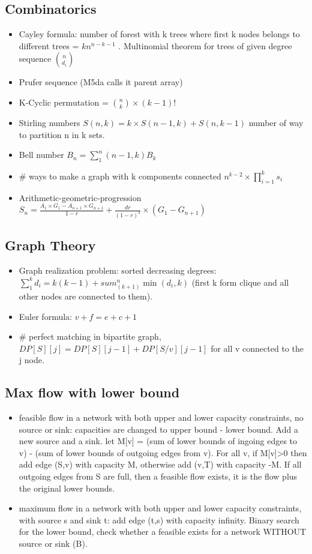 \subsection{Combinatorics}
\begin{itemize}
\item Cayley formula: number of forest with k trees where first k nodes belongs to different trees = $k n^{n-k-1}$ . Multinomial theorem for trees of given degree sequence ${\binom{n}{d_i}}$
\item Prufer sequence (M5da calls it parent array)
\item  K-Cyclic permutation = ${\binom{n}{k}} \times (k-1)!$
\item Stirling numbers $S(n,k) = k \times S(n-1,k) + S(n,k-1)$ number of way to partition n in k sets.
\item Bell number $B_n = \sum_1^n (n-1, k) B_k$ 
\item \# ways to make a graph with k components connected $n^{k-2} \times \prod_{i=1}^k s_i$
\item Arithmetic-geometric-progression $S_n = \frac{A_1 \times G_1 - A_{n+1} \times G_{n+1}}{1-r} + \frac{dr}{(1-r)^2} \times (G_1-G_{n+1})$
\end{itemize}
\hrulefill
\subsection{Graph Theory}
\begin{itemize}
\item Graph realization problem: sorted decreasing degrees: $\sum_1^k d_i = k(k-1)+sum_(k+1)^n \min(d_i,k)$ (first k form clique and all other nodes are connected to them).
\item Euler formula: $v+f = e+c+1$
\item \# perfect matching in bipartite graph, $DP[S][j] = DP[S][j-1] + DP[S/{v}][j-1]$ for all v connected to the j node.
\end{itemize}
\hrulefill
\subsection{Max flow with lower bound}
\begin{itemize}
\item feasible flow in a network with both upper and lower capacity constraints, no source or sink: capacities are changed to upper bound - lower bound. Add a new source and a sink. let M[v] = (sum of lower bounds of ingoing edges to v) - (sum of lower bounds of outgoing edges from v). For all v, if M[v]>0 then add edge (S,v) with capacity M, otherwise add (v,T) with capacity -M. If all outgoing edges from S are full, then a feasible flow exists, it is the flow plus the original lower bounds.
\item maximum flow in a network with both upper and lower capacity constraints, with source s and sink t: add edge (t,s) with capacity infinity. Binary search for the lower bound, check whether a feasible exists for a network WITHOUT source or sink (B).
\end{itemize}
\hrulefill
